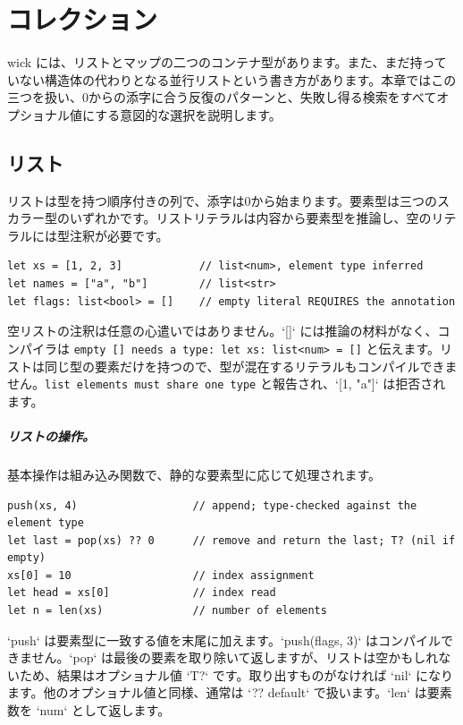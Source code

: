 \chapter{コレクション}

wick には、リストとマップの二つのコンテナ型があります。また、まだ持っていない構造体の代わりとなる並行リストという書き方があります。本章ではこの三つを扱い、0からの添字に合う反復のパターンと、失敗し得る検索をすべてオプショナル値にする意図的な選択を説明します。

\section{リスト}

リストは型を持つ順序付きの列で、添字は0から始まります。要素型は三つのスカラー型のいずれかです。リストリテラルは内容から要素型を推論し、空のリテラルには型注釈が必要です。

\begin{lstlisting}[language=wick]
let xs = [1, 2, 3]            // list<num>, element type inferred
let names = ["a", "b"]        // list<str>
let flags: list<bool> = []    // empty literal REQUIRES the annotation
\end{lstlisting}

\noindent
空リストの注釈は任意の心遣いではありません。`[]` には推論の材料がなく、コンパイラは \texttt{empty [] needs a type: let xs: list<num> = []} と伝えます。リストは同じ型の要素だけを持つので、型が混在するリテラルもコンパイルできません。\texttt{list elements must share one type} と報告され、`[1, "a"]` は拒否されます。

\paragraph{リストの操作。} 基本操作は組み込み関数で、静的な要素型に応じて処理されます。

\begin{lstlisting}[language=wick]
push(xs, 4)                  // append; type-checked against the element type
let last = pop(xs) ?? 0      // remove and return the last; T? (nil if empty)
xs[0] = 10                   // index assignment
let head = xs[0]             // index read
let n = len(xs)              // number of elements
\end{lstlisting}

\noindent
`push` は要素型に一致する値を末尾に加えます。`push(flags, 3)` はコンパイルできません。`pop` は最後の要素を取り除いて返しますが、リストは空かもしれないため、結果はオプショナル値 `T?` です。取り出すものがなければ `nil` になります。他のオプショナル値と同様、通常は `?? default` で扱います。`len` は要素数を `num` として返します。

